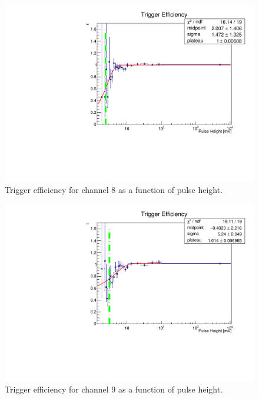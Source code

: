 \documentclass[12pt]{article}
\begin{document}
\begin{figure}[t!]
\centering
\centerline{\includegraphics[scale=0.5]{figures/triggerEfficiency/Efficiency_Run2272_TC_CH8_Height_Eff_vs_Run2271_DC_CH8_Height_Eff}}
{\caption{ Trigger efficiency for channel 8 as a function of pulse height.  }

\label{fig:ch8}
}
\end{figure}

\begin{figure}[t!]
\centering
\centerline{\includegraphics[scale=0.5]{figures/triggerEfficiency/Efficiency_Run2273_TC_CH9_Height_Eff_vs_Run2271_DC_CH9_Height_Eff}}
{\caption{ Trigger efficiency for channel 9 as a function of pulse height.  }

\label{fig:ch9}
}
\end{figure}
\end{document}

